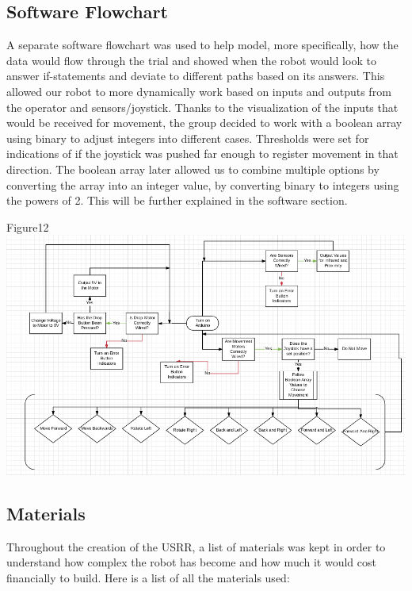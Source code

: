 \documentclass{article}
\begin{document}
\subsection{Software Flowchart}    
A separate software flowchart was used to help model, more specifically, how the data would flow through the trial and showed when the robot would look to answer if-statements and deviate to different paths based on its answers. This allowed our robot to more dynamically work based on inputs and outputs from the operator and sensors/joystick. Thanks to the visualization of the inputs that would be received for movement, the group decided to work with a boolean array using binary to adjust integers into different cases. Thresholds were set for indications of if the joystick was pushed far enough to register movement in that direction. The boolean array later allowed us to combine multiple options by converting the array into an integer value, by converting binary to integers using the powers of 2. This will be further explained in the software section.
    \begin{center}{Figure12 \includegraphics[width=\textwidth]{SoftwareFlowchart.png}}\end{center}
    
\subsection{Materials}
Throughout the creation of the USRR, a list of materials was kept in order to understand how complex the robot has become and how much it would cost financially to build. Here is a list of all the materials used:
\end{document}
